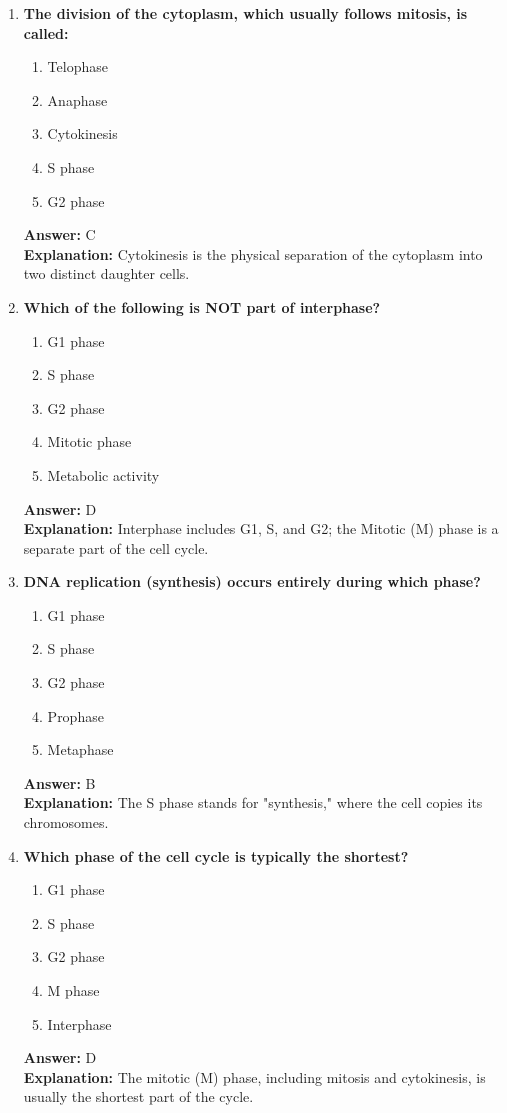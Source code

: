 \documentclass[11pt, a4paper]{article}
\begin{document}
\begin{enumerate}[leftmargin=*, label=\arabic*.]
\item \textbf{The division of the cytoplasm, which usually follows mitosis, is called:}
\begin{enumerate}[label=\Alph*.]
\item Telophase
\item Anaphase
\item Cytokinesis
\item S phase
\item G2 phase
\end{enumerate}
\textbf{Answer:} C \\
\textbf{Explanation:} Cytokinesis is the physical separation of the cytoplasm into two distinct daughter cells.

\item \textbf{Which of the following is NOT part of interphase?}
\begin{enumerate}[label=\Alph*.]
\item G1 phase
\item S phase
\item G2 phase
\item Mitotic phase
\item Metabolic activity
\end{enumerate}
\textbf{Answer:} D \\
\textbf{Explanation:} Interphase includes G1, S, and G2; the Mitotic (M) phase is a separate part of the cell cycle.

\item \textbf{DNA replication (synthesis) occurs entirely during which phase?}
\begin{enumerate}[label=\Alph*.]
\item G1 phase
\item S phase
\item G2 phase
\item Prophase
\item Metaphase
\end{enumerate}
\textbf{Answer:} B \\
\textbf{Explanation:} The S phase stands for "synthesis," where the cell copies its chromosomes.

\item \textbf{Which phase of the cell cycle is typically the shortest?}
\begin{enumerate}[label=\Alph*.]
\item G1 phase
\item S phase
\item G2 phase
\item M phase
\item Interphase
\end{enumerate}
\textbf{Answer:} D \\
\textbf{Explanation:} The mitotic (M) phase, including mitosis and cytokinesis, is usually the shortest part of the cycle.


\end{enumerate}
\end{document}
